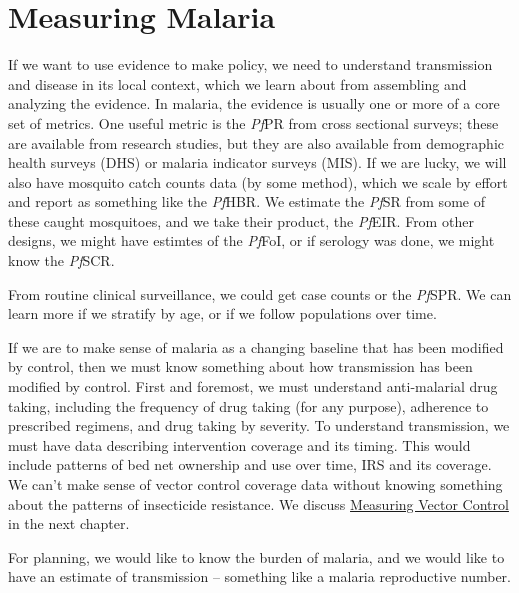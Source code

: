 \documentclass[
]{book}
\begin{document}
\hypertarget{measuring-malaria}{%
\chapter{Measuring Malaria}\label{measuring-malaria}}

If we want to use evidence to make policy, we need to understand transmission and disease in its local context, which we learn about from assembling and analyzing the evidence. In malaria, the evidence is usually one or more of a core set of metrics. One useful metric is the \emph{Pf}PR from cross sectional surveys; these are available from research studies, but they are also available from demographic health surveys (DHS) or malaria indicator surveys (MIS). If we are lucky, we will also have mosquito catch counts data (by some method), which we scale by effort and report as something like the \emph{Pf}HBR. We estimate the \emph{Pf}SR from some of these caught mosquitoes, and we take their product, the \emph{Pf}EIR. From other designs, we might have estimtes of the \emph{Pf}FoI, or if serology was done, we might know the \emph{Pf}SCR.

From routine clinical surveillance, we could get case counts or the \emph{Pf}SPR. We can learn more if we stratify by age, or if we follow populations over time.

If we are to make sense of malaria as a changing baseline that has been modified by control, then we must know something about how transmission has been modified by control. First and foremost, we must understand anti-malarial drug taking, including the frequency of drug taking (for any purpose), adherence to prescribed regimens, and drug taking by severity. To understand transmission, we must have data describing intervention coverage and its timing. This would include patterns of bed net ownership and use over time, IRS and its coverage. We can't make sense of vector control coverage data without knowing something about the patterns of insecticide resistance. We discuss \protect\hyperlink{measuring-vector-control}{Measuring Vector Control} in the next chapter.

For planning, we would like to know the burden of malaria, and we would like to have an estimate of transmission -- something like a malaria reproductive number.
\end{document}
